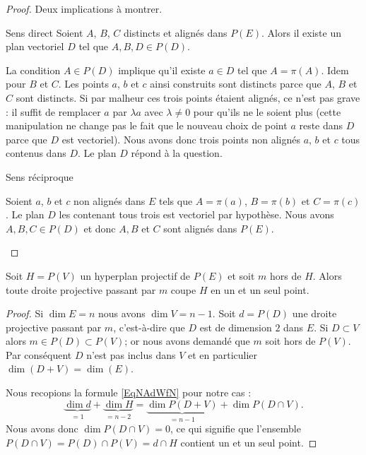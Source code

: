 \begin{proof}
    Deux implications à montrer.
    \begin{subproof}
        \item[Sens direct]
            Soient \( A\), \( B\), \( C\) distincts et alignés dans \( P(E)\). Alors il existe un plan vectoriel \( D\) tel que \( A,B,D\in P(D)\).

            La condition \( A\in P(D)\) implique qu'il existe \( a\in D\) tel que \( A=\pi(A)\). Idem pour \( B\) et \( C\). Les points \( a\), \( b\) et \( c\) ainsi construits sont distincts parce que \( A\), \( B\) et \( C\) sont distincts. Si par malheur ces trois points étaient alignés, ce n'est pas grave : il suffit de remplacer \( a\) par \( \lambda a\) avec \( \lambda\neq 0\) pour qu'ils ne le soient plus (cette manipulation ne change pas le fait que le nouveau choix de point \( a\) reste dans \( D\) parce que \( D\) est vectoriel). Nous avons donc trois points non alignés \( a\), \( b\) et \( c\) tous contenus dans \( D\). Le plan \( D\) répond à la question.

        \item[Sens réciproque]

            Soient \( a\), \( b\) et \( c\) non alignés dans \( E\) tels que \( A=\pi(a)\), \( B=\pi(b)\) et \( C=\pi(c)\). Le plan \( D\) les contenant tous trois est vectoriel par hypothèse. Nous avons \( A,B,C\in P(D)\) et donc \( A,B\) et $C$ sont alignés dans \( P(E)\).
    \end{subproof}
\end{proof}

\begin{proposition}
    Soit \( H=P(V)\) un hyperplan projectif de \( P(E)\) et soit \( m\) hors de \( H\). Alors toute droite projective passant par \( m\) coupe \( H\) en un et un seul point.
\end{proposition}

\begin{proof}
    Si \( \dim E=n\) nous avons \( \dim V=n-1\). Soit \( d=P(D)\) une droite projective passant par \( m\), c'est-à-dire que \( D\) est de dimension \( 2\) dans \( E\). Si \( D\subset V\) alors \( m\in P(D)\subset P(V)\); or nous avons demandé que \( m\) soit hors de \( P(V)\). Par conséquent \( D\) n'est pas inclus dans \( V\) et en particulier \( \dim(D+V)=\dim(E)\).

    Nous recopions la formule \eqref{EqNAdWfN} pour notre cas :
    \begin{equation}
        \underbrace{\dim d}_{=1}+\underbrace{\dim H}_{=n-2}=\underbrace{\dim P(D+V)}_{=n-1}+\dim P(D\cap V).
    \end{equation}
    Nous avons donc \( \dim P(D\cap V)=0\), ce qui signifie que l'ensemble \( P(D\cap V)=P(D)\cap P(V)=d\cap H\) contient un et un seul point.
\end{proof}

